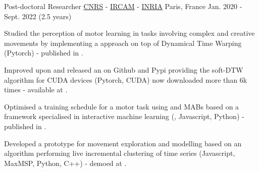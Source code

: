 

\begin{cventries}

  \cventry
    {Post-doctoral Researcher} %
    {\href{https://hci.isir.upmc.fr/}{CNRS} - \href{https://ismm.ircam.fr/}{IRCAM} - \href{https://ex-situ.lri.fr/}{INRIA}} %
    {Paris, France} %
    {Jan. 2020 - Sept. 2022 (2.5 years)} %
    {
      \begin{cvitems} %
        \item {Studied the perception of motor learning in tasks involving complex and creative movements by implementing a  approach on top of Dynamical Time Warping (Pytorch) - published in .}
        \item {Improved upon and released an  on Github and Pypi providing the soft-DTW algorithm for CUDA devices (Pytorch, CUDA) now downloaded more than 6k times - available at .}
        \item {Optimised a training schedule for a motor task using  and MABs based on a framework specialised in interactive machine learning (, Javascript, Python) - published in .}
        \item {Developed a prototype for movement exploration and modelling based on an algorithm performing live incremental clustering of time series (Javascript, MaxMSP, Python, C++) - demoed at .}
      \end{cvitems}
    }


\end{cventries}
